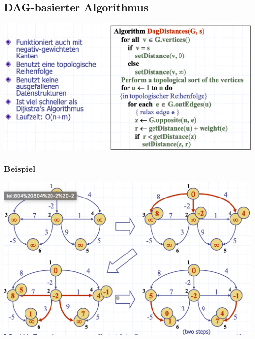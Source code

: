 \subsection{DAG-basierter Algorithmus}
\begin{center}
    \includegraphics[scale=.32]{graphic/15 ShortestPathTrees/DAG1.png}
\end{center}
\vspace{-8pt}
\subsubsection{Beispiel}
\begin{center}
    \includegraphics[scale=.3]{graphic/15 ShortestPathTrees/DAG2.png}
\end{center}
\vspace{-8pt}



\newpage